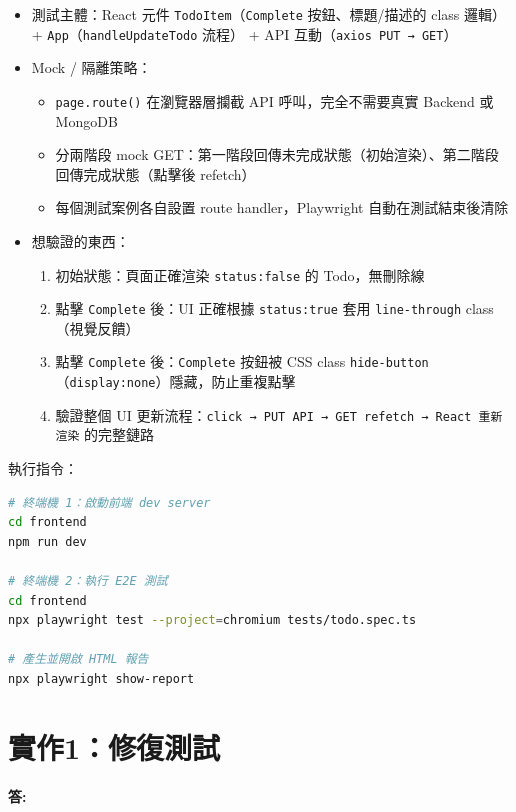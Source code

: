 \documentclass[11pt,a4paper]{article}
\begin{document}
\begin{itemize}
\item 測試主體：React 元件 \texttt{TodoItem}（\texttt{Complete} 按鈕、標題/描述的 class 邏輯）+ \texttt{App}（\texttt{handleUpdateTodo} 流程） + API 互動（\texttt{axios PUT → GET}）

\item Mock / 隔離策略：
    \begin{itemize}
        \item \texttt{page.route()} 在瀏覽器層攔截 API 呼叫，完全不需要真實 Backend 或 MongoDB
        \item 分兩階段 mock GET：第一階段回傳未完成狀態（初始渲染）、第二階段回傳完成狀態（點擊後 refetch）
        \item 每個測試案例各自設置 route handler，Playwright 自動在測試結束後清除
    \end{itemize}

\item 想驗證的東西：
    \begin{enumerate}
        \item 初始狀態：頁面正確渲染 \texttt{status:false} 的 Todo，無刪除線
        \item 點擊 \texttt{Complete} 後：UI 正確根據 \texttt{status:true} 套用 \texttt{line-through} class（視覺反饋）
        \item 點擊 \texttt{Complete} 後：\texttt{Complete} 按鈕被 CSS class \texttt{hide-button}（\texttt{display:none}）隱藏，防止重複點擊
        \item 驗證整個 UI 更新流程：\texttt{click → PUT API → GET refetch → React 重新渲染} 的完整鏈路
    \end{enumerate}
\end{itemize}

執行指令：
\begin{lstlisting}[language=Bash]
# 終端機 1：啟動前端 dev server
cd frontend
npm run dev

# 終端機 2：執行 E2E 測試
cd frontend
npx playwright test --project=chromium tests/todo.spec.ts

# 產生並開啟 HTML 報告
npx playwright show-report
\end{lstlisting}



\section*{實作1：修復測試}


\paragraph*{答:}
\end{document}
